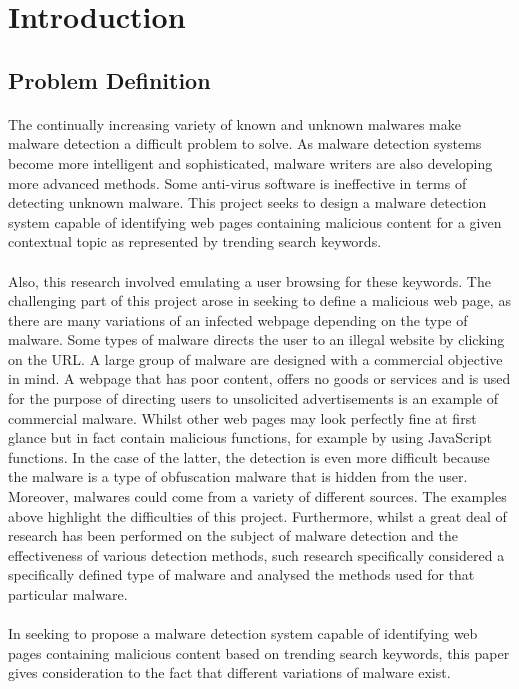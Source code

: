 \section{Introduction}

\subsection{Problem Definition}

\paragraph{} 
The continually increasing variety of known and unknown malwares make malware detection a difficult problem to solve. As malware detection systems become more intelligent and sophisticated, malware writers are also developing more advanced methods. Some anti-virus software is ineffective in terms of detecting unknown malware. This project seeks to design a malware detection system capable of identifying web pages containing malicious content for a given contextual topic as represented by trending search keywords. 

\paragraph{} 
Also, this research involved emulating a user browsing for these keywords. The challenging part of this project arose in seeking to define a malicious web page, as there are many variations of an infected webpage depending on the type of malware. 
Some types of malware directs the user to an illegal website by clicking on the URL. A large group of malware are designed with a commercial objective in mind. A webpage that has poor content, offers no goods or services and is used for the purpose of directing users to unsolicited advertisements is an example of commercial malware. Whilst other web pages may look perfectly fine at first glance but in fact contain malicious functions, for example by using JavaScript functions. In the case of the latter, the detection is even more difficult because the malware is a type of obfuscation malware that is hidden from the user. Moreover, malwares could come from a variety of different sources.
The examples above highlight the difficulties of this project. Furthermore, whilst a great deal of research has been performed on the subject of malware detection and the effectiveness of various detection methods, such research specifically considered a specifically defined type of malware and analysed the methods used for that particular malware. 

\paragraph{} 
In seeking to propose a malware detection system capable of identifying web pages containing malicious content based on trending search keywords, this paper gives consideration to the fact that different variations of malware exist. 
